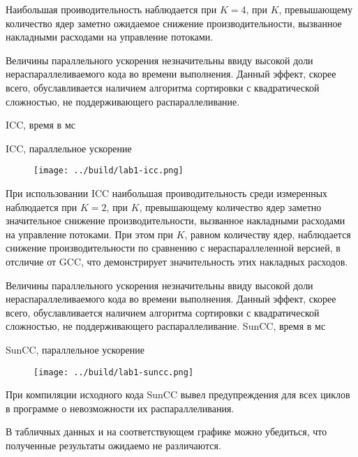 \documentclass[14pt, a4paper, oneside, final]{extarticle}
\begin{document}
Наибольшая проиводительность наблюдается при $K=4$, при $K$, превышающему количество ядер заметно ожидаемое снижение производительности, вызванное накладными расходами на управление потоками.

Величины параллельного ускорения незначительны ввиду высокой доли нераспараллеливаемого кода во времени выполнения. Данный эффект, скорее всего, обуславливается наличием алгоритма сортировки с квадратической сложностью, не поддерживающего распараллеливание.


\clearpage
ICC, время в мс


ICC, параллельное ускорение



\begin{figure}[ht!]

\texttt{[image: ../build/lab1-icc.png]}
\end{figure}
При использовании ICC наибольшая проиводительность среди измеренных наблюдается при $K=2$, при $K$, превышающему количество ядер заметно значительное снижение производительности, вызванное накладными расходами на управление потоками. При этом при $K$, равном количеству ядер, наблюдается снижение производительности по сравнению с нераспараллеленной версией, в отсличие от GCC, что демонстрирует значительность этих накладных расходов.

Величины параллельного ускорения незначительны ввиду высокой доли нераспараллеливаемого кода во времени выполнения. Данный эффект, скорее всего, обуславливается наличием алгоритма сортировки с квадратической сложностью, не поддерживающего распараллеливание.
\clearpage
SunCC, время в мс


SunCC, параллельное ускорение


\begin{figure}[ht!]

\texttt{[image: ../build/lab1-suncc.png]}
\end{figure}

При компиляции исходного кода SunCC вывел предупреждения для всех циклов в программе о невозможности их распараллеливания.

В табличных данных и на соответствующем графике можно убедиться, что полученные результаты ожидаемо не различаются.
\end{document}

